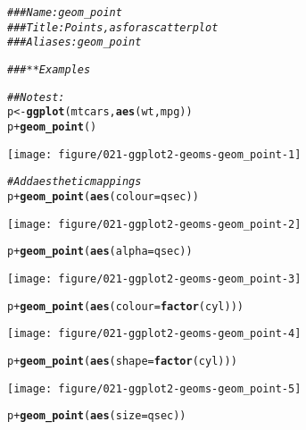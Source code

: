 \documentclass[a4paper,titlepage]{tufte-handout}\usepackage[]{graphicx}\usepackage[]{color}
\makeatletter
\def\maxwidth{ %
  \ifdim\Gin@nat@width>\linewidth
    \linewidth
  \else
    \Gin@nat@width
  \fi
}
\newcommand{\hlcom}[1]{\textcolor[rgb]{0.678,0.584,0.686}{\textit{#1}}}%
\newcommand{\hlopt}[1]{\textcolor[rgb]{0,0,0}{#1}}%
\newcommand{\hlstd}[1]{\textcolor[rgb]{0.345,0.345,0.345}{#1}}%
\newcommand{\hlkwb}[1]{\textcolor[rgb]{0.69,0.353,0.396}{#1}}%
\newcommand{\hlkwc}[1]{\textcolor[rgb]{0.333,0.667,0.333}{#1}}%
\newcommand{\hlkwd}[1]{\textcolor[rgb]{0.737,0.353,0.396}{\textbf{#1}}}%
\newenvironment{kframe}{%
 \def\at@end@of@kframe{}%
 \ifinner\ifhmode%
  \def\at@end@of@kframe{\end{minipage}}%
  \begin{minipage}{\columnwidth}%
 \fi\fi%
 \def\FrameCommand##1{\hskip\@totalleftmargin \hskip-\fboxsep
 \colorbox{shadecolor}{##1}\hskip-\fboxsep
     \hskip-\linewidth \hskip-\@totalleftmargin \hskip\columnwidth}%
 \MakeFramed {\advance\hsize-\width
   \@totalleftmargin\z@ \linewidth\hsize
   \@setminipage}}%
 {\par\unskip\endMakeFramed%
 \at@end@of@kframe}
\newenvironment{knitrout}{}{} %
\makeatother
\begin{document}
\begin{knitrout}
\color{fgcolor}\begin{kframe}
\begin{alltt}
\hlcom{### Name: geom_point}
\hlcom{### Title: Points, as for a scatterplot}
\hlcom{### Aliases: geom_point}

\hlcom{### ** Examples}

\hlcom{## No test: }
\hlstd{p} \hlkwb{<-} \hlkwd{ggplot}\hlstd{(mtcars,} \hlkwd{aes}\hlstd{(wt, mpg))}
\hlstd{p} \hlopt{+} \hlkwd{geom_point}\hlstd{()}
\end{alltt}
\end{kframe}
\texttt{[image: figure/021-ggplot2-geoms-geom\_point-1]} 
\begin{kframe}\begin{alltt}
\hlcom{# Add aesthetic mappings}
\hlstd{p} \hlopt{+} \hlkwd{geom_point}\hlstd{(}\hlkwd{aes}\hlstd{(}\hlkwc{colour} \hlstd{= qsec))}
\end{alltt}
\end{kframe}
\texttt{[image: figure/021-ggplot2-geoms-geom\_point-2]} 
\begin{kframe}\begin{alltt}
\hlstd{p} \hlopt{+} \hlkwd{geom_point}\hlstd{(}\hlkwd{aes}\hlstd{(}\hlkwc{alpha} \hlstd{= qsec))}
\end{alltt}
\end{kframe}
\texttt{[image: figure/021-ggplot2-geoms-geom\_point-3]} 
\begin{kframe}\begin{alltt}
\hlstd{p} \hlopt{+} \hlkwd{geom_point}\hlstd{(}\hlkwd{aes}\hlstd{(}\hlkwc{colour} \hlstd{=} \hlkwd{factor}\hlstd{(cyl)))}
\end{alltt}
\end{kframe}
\texttt{[image: figure/021-ggplot2-geoms-geom\_point-4]} 
\begin{kframe}\begin{alltt}
\hlstd{p} \hlopt{+} \hlkwd{geom_point}\hlstd{(}\hlkwd{aes}\hlstd{(}\hlkwc{shape} \hlstd{=} \hlkwd{factor}\hlstd{(cyl)))}
\end{alltt}
\end{kframe}
\texttt{[image: figure/021-ggplot2-geoms-geom\_point-5]} 
\begin{kframe}\begin{alltt}
\hlstd{p} \hlopt{+} \hlkwd{geom_point}\hlstd{(}\hlkwd{aes}\hlstd{(}\hlkwc{size} \hlstd{= qsec))}

\end{alltt}
\end{kframe}
\end{knitrout}
\end{document}
